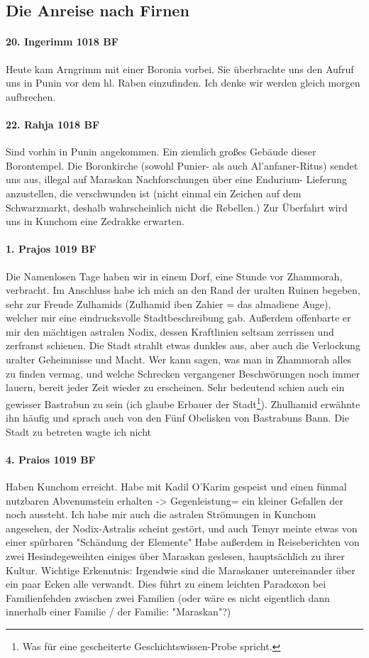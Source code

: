 \subsection{Die Anreise nach Firnen}
\paragraph{20. Ingerimm 1018 BF}
Heute kam Arngrimm mit einer Boronia vorbei. Sie überbrachte uns den Aufruf uns in Punin vor dem hl. Raben einzufinden. Ich denke wir werden gleich morgen aufbrechen.

\paragraph{22. Rahja 1018 BF}
Sind vorhin in Punin angekommen. Ein ziemlich großes Gebäude dieser Borontempel. Die Boronkirche (sowohl Punier- als auch Al'anfaner-Ritus) sendet uns aus, illegal auf Maraskan Nachforschungen über eine Endurium- Lieferung anzustellen, die verschwunden ist (nicht einmal ein Zeichen auf dem Schwarzmarkt, deshalb wahrscheinlich nicht die Rebellen.) Zur Überfahrt wird uns in Kunchom eine Zedrakke erwarten.

\paragraph{1. Prajos 1019 BF}
Die Namenlosen Tage haben wir in einem Dorf, eine Stunde vor Zhammorah, verbracht. Im Anschluss habe ich mich an den Rand der uralten Ruinen begeben, sehr zur Freude Zulhamids (Zulhamid iben Zahier = das almadiene Auge), welcher mir eine eindrucksvolle Stadtbeschreibung gab. Außerdem offenbarte er mir den mächtigen astralen Nodix, dessen Kraftlinien seltsam zerrissen und zerfranst schienen. Die Stadt strahlt etwas dunkles aus, aber auch die Verlockung uralter Geheimnisse und Macht. Wer kann sagen, was man in Zhammorah alles zu finden vermag, und welche Schrecken vergangener Beschwörungen noch immer lauern, bereit jeder Zeit wieder zu erscheinen. Sehr bedeutend schien auch ein gewisser Bastrabun zu sein (ich glaube Erbauer der Stadt\footnote{Was für eine gescheiterte Geschichtswissen-Probe spricht.}). Zhulhamid erwähnte ihn häufig und sprach auch von den Fünf Obelisken von Bastrabuns Bann. Die Stadt zu betreten wagte ich nicht

\paragraph{4. Praios 1019 BF}
Haben Kunchom erreicht. Habe mit Kadil O'Karim gespeist und einen fünmal nutzbaren Abvenumstein erhalten -> Gegenleistung= ein kleiner Gefallen der noch aussteht.
Ich habe mir auch die astralen Strömungen in Kunchom angesehen, der Nodix-Astralis scheint gestört, und auch Temyr meinte etwas von einer spürbaren "Schändung der Elemente"
Habe außerdem in Reiseberichten von zwei Hesindegeweihten einiges über Maraskan geslesen, hauptsächlich zu ihrer Kultur. Wichtige Erkenntnis: Irgendwie sind die Maraskaner untereinander über ein paar Ecken alle verwandt. Dies führt zu einem leichten Paradoxon bei Familienfehden zwischen zwei Familien (oder wäre es nicht eigentlich dann innerhalb einer Familie / der Familie: "Maraskan"?)

